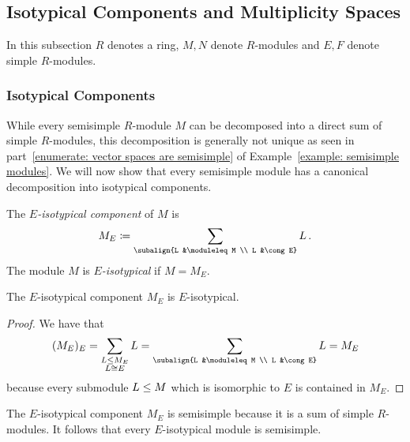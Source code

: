 \subsection{Isotypical Components and Multiplicity Spaces}
\label{subsection: isotyipical components and multiplicity spaces}


\begin{conventions}
  In this subsection $R$ denotes a ring, $M, N$ denote $R$-modules and $E, F$ denote simple $R$-modules.
\end{conventions}





\subsubsection{Isotypical Components}


\begin{fluff}
  While every semisimple $R$-module $M$ can be decomposed into a direct sum of simple $R$-modules, this decomposition is generally not unique as seen in part~\ref*{enumerate: vector spaces are semisimple} of Example~\ref{example: semisimple modules}.
  We will now show that every semisimple module has a canonical decomposition into isotypical components.
\end{fluff}


\begin{definition}
  The \emph{$E$-isotypical component} of $M$ is
  \[
              M_E
    \defined  \sum_{\subalign{L &\moduleleq M \\ L &\cong E}} L \,.
  \]
  The module $M$ is \emph{$E$-isotypical} if $M = M_E$.
\end{definition}


\begin{lemma}
  The $E$-isotypical component $M_E$ is $E$-isotypical.
\end{lemma}


\begin{proof}
  We have that
  \[
      (M_E)_E
    = \sum_{\substack{L \moduleleq M_E \\ L \cong E}} L
    = \sum_{\subalign{L &\moduleleq M \\ L &\cong E}} L
    = M_E
  \]
  because every submodule $L \leq M$ which is isomorphic to $E$ is contained in $M_E$.
\end{proof}


\begin{remark}
  The $E$-isotypical component $M_E$ is semisimple because it is a sum of simple $R$-modules.
  It follows that every $E$-isotypical module is semisimple.
\end{remark}


